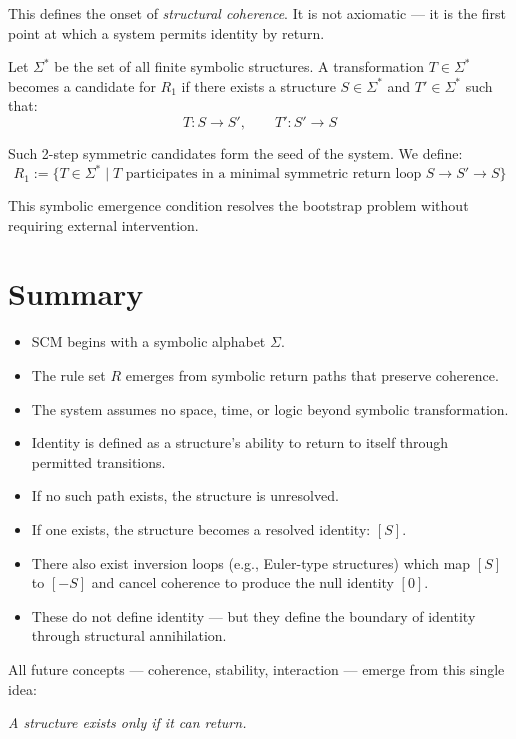 This defines the onset of \textit{structural coherence}.  
It is not axiomatic — it is the first point at which a system permits identity by return.

\begin{definition} \label{def:structural-bootstrap}
Let $\Sigma^*$ be the set of all finite symbolic structures.  
A transformation $T \in \Sigma^*$ becomes a candidate for $R_1$ if there exists a structure $S \in \Sigma^*$ and $T' \in \Sigma^*$ such that:
\begin{equation} \label{eq:bootstrap-pair}
T: S \rightarrow S', \qquad T': S' \rightarrow S
\end{equation}

Such 2-step symmetric candidates form the seed of the system. We define:
\begin{equation} \label{eq:r1-bootstrap}
R_1 := \{ T \in \Sigma^* \mid T \text{ participates in a minimal symmetric return loop } S \rightarrow S' \rightarrow S \}
\end{equation}
\end{definition}

This symbolic emergence condition resolves the bootstrap problem without requiring external intervention.

\section{Summary} \label{summary}

\begin{itemize}
  \item SCM begins with a symbolic alphabet $\Sigma$.
  \item The rule set $R$ emerges from symbolic return paths that preserve coherence.
  \item The system assumes no space, time, or logic beyond symbolic transformation.
  \item Identity is defined as a structure's ability to return to itself through permitted transitions.
  \item If no such path exists, the structure is unresolved.
  \item If one exists, the structure becomes a resolved identity: $[S]$.
  \item There also exist inversion loops (e.g., Euler-type structures) which map $[S]$ to $[-S]$ and cancel coherence to produce the null identity $[0]$.
  \item These do not define identity — but they define the boundary of identity through structural annihilation.
\end{itemize}

All future concepts — coherence, stability, interaction — emerge from this single idea:
\begin{center}
\emph{A structure exists only if it can return.}
\end{center}